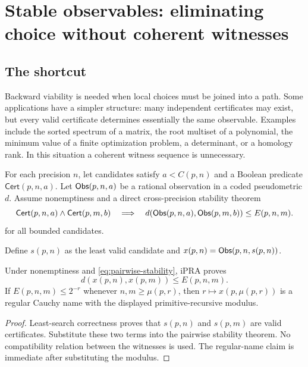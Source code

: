 \section{Stable observables: eliminating choice without coherent witnesses}
\label{sec:stable}

\subsection{The shortcut}

Backward viability is needed when local choices must be joined into a path.
Some applications have a simpler structure: many independent certificates may
exist, but every valid certificate determines essentially the same observable.
Examples include the sorted spectrum of a matrix, the root multiset of a
polynomial, the minimum value of a finite optimization problem, a determinant,
or a homology rank.  In this situation a coherent witness sequence is
unnecessary.

For each precision \(n\), let candidates satisfy
\(a<C(p,n)\) and a Boolean predicate \(\mathsf{Cert}(p,n,a)\).  Let
\(\mathsf{Obs}(p,n,a)\) be a rational observation in a coded pseudometric \(d\).
Assume nonemptiness and a direct cross-precision stability theorem
\begin{equation}
 \mathsf{Cert}(p,n,a)\wedge\mathsf{Cert}(p,m,b)
 \quad\Longrightarrow\quad
 d(\mathsf{Obs}(p,n,a),\mathsf{Obs}(p,m,b))\le E(p,n,m).
 \label{eq:pairwise-stability}
\end{equation}
for all bounded candidates.

Define \(s(p,n)\) as the least valid candidate and
\(x(p,n)=\mathsf{Obs}(p,n,s(p,n))\).

\begin{theorem}
\label{thm:stable-erasure}
Under nonemptiness and \eqref{eq:pairwise-stability}, iPRA proves
\[
 d(x(p,n),x(p,m))\le E(p,n,m).
\]
If \(E(p,n,m)\le 2^{-r}\) whenever \(n,m\ge\mu(p,r)\), then
\(r\mapsto x(p,\mu(p,r))\) is a regular Cauchy name with the displayed
primitive-recursive modulus.
\end{theorem}

\begin{proof}
Least-search correctness proves that \(s(p,n)\) and \(s(p,m)\) are valid
certificates.  Substitute these two terms into the pairwise stability theorem.
No compatibility relation between the witnesses is used.  The regular-name
claim is immediate after substituting the modulus.
\end{proof}

